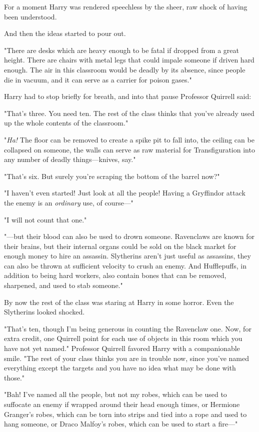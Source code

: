 For a moment Harry was rendered speechless by the sheer, raw shock of having 
been understood.

And then the ideas started to pour out.

"There are desks which are heavy enough to be fatal if dropped from a great 
height. There are chairs with metal legs that could impale someone if driven 
hard enough. The air in this classroom would be deadly by its absence, since 
people die in vacuum, and it can serve as a carrier for poison gases."

Harry had to stop briefly for breath, and into that pause Professor Quirrell 
said:

"That's three. You need ten. The rest of the class thinks that you've already 
used up the whole contents of the classroom."

"\emph{Ha!} The floor can be removed to create a spike pit to fall into, the 
ceiling can be collapsed on someone, the walls can serve as raw material for 
Transfiguration into any number of deadly things---knives, say."

"That's six. But surely you're scraping the bottom of the barrel now?"

"I haven't even started! Just look at all the people! Having a Gryffindor 
attack the enemy is an \emph{ordinary} use, of course---"

"I will not count that one."

"---but their blood can also be used to drown someone. Ravenclaws are known for 
their brains, but their internal organs could be sold on the black market for 
enough money to hire an assassin. Slytherins aren't just useful as assassins, 
they can also be thrown at sufficient velocity to crush an enemy. And 
Hufflepuffs, in addition to being hard workers, also contain bones that can be 
removed, sharpened, and used to stab someone."

By now the rest of the class was staring at Harry in some horror. Even the 
Slytherins looked shocked.

"That's ten, though I'm being generous in counting the Ravenclaw one. Now, for 
extra credit, one Quirrell point for each use of objects in this room which you 
have not yet named." Professor Quirrell favored Harry with a companionable 
smile. "The rest of your class thinks you are in trouble now, since you've 
named everything except the targets and you have no idea what may be done with 
those."

"Bah! I've named all the people, but not my robes, which can be used to 
suffocate an enemy if wrapped around their head enough times, or Hermione 
Granger's robes, which can be torn into strips and tied into a rope and used to 
hang someone, or Draco Malfoy's robes, which can be used to start a fire---"

